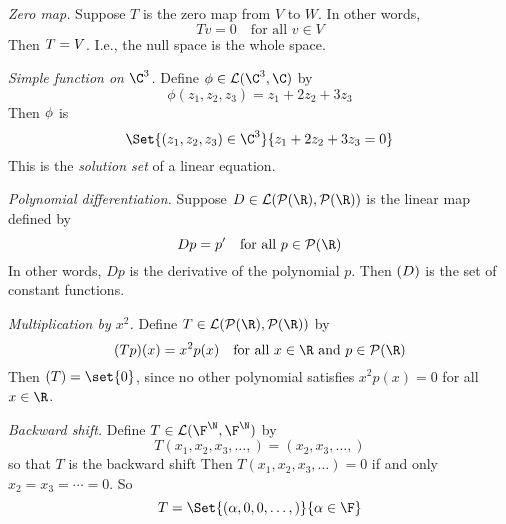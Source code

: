 \textit{Zero map.}
Suppose $T$ is the zero map from $V$ to $W$.
In other words,
\[
Tv = 0 \quad \text{for all } v \in V
\]
Then $\null T = V$.
I.e., the null space is the whole space.

\textit{Simple function on $\C ^3$.}
Define $\phi  \in \mathcal{L} (\C ^3, \C )$ by
\[
\phi (z_1, z_2, z_3) = z_1 + 2z_2 + 3z_3
\]
Then $\null \phi $ is
\[
\Set{(z_1,z_2,z_3) \in \C ^3}{z_1 + 2z_2 + 3z_3 = 0}
\]
This is the \textit{solution set} of a linear equation.

\textit{Polynomial differentiation.}
Suppose $D \in \mathcal{L} (\mathcal{P} (\R ), \mathcal{P} (\R ))$ is the linear map defined by
\[
Dp = p' \quad \text{for all } p \in \mathcal{P} (\R )
\]
In other words, $Dp$ is the derivative of the polynomial $p$.
Then $\null(D)$ is the set of constant functions.

\textit{Multiplication by $x^2$.}
Define $T \in \mathcal{L} (\mathcal{P} (\R ), \mathcal{P} (\R ))$ by
\[
(Tp)(x) = x^2p(x) \quad \text{for all } x \in \R  \text{ and } p \in \mathcal{P} (\R )
\]
Then $\null(T) = \set{0}$, since no other polynomial satisfies $x^2p(x) = 0$ for all $x \in \R $.

\textit{Backward shift.}
Define $T \in \mathcal{L} (\F ^\N  , \F ^\N  )$ by
\[
T(x_1, x_2, x_3, \dots , ) = (x_2, x_3, \dots , )
\]
so that $T$ is the backward shift
Then $T(x_1, x_2, x_3, \dots ) = 0$ if and only $x_2 = x_3 = \cdots = 0$.
So
\[
\null T = \Set{(\alpha , 0, 0, \dots ,)}{\alpha  \in \F }
\]

\blankpage